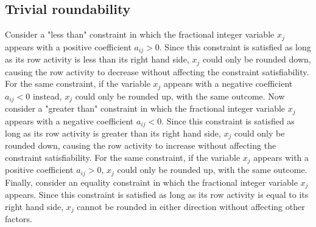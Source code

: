 \documentclass[a4paper,12pt]{book}
\begin{document}
\subsection{Trivial roundability}
Consider a "less than" constraint in which the fractional integer variable $x_j$ appears with a positive coefficient $a_{ij} > 0$. Since this constraint is satisfied as long as its row activity is less than its right hand side, $x_j$ could only be rounded down, causing the row activity to decrease without affecting the constraint satisfiability. For the same constraint, if the variable $x_j$ appears with a negative coefficient $a_{ij} < 0$ instead, $x_j$ could only be rounded up, with the same outcome.
Now consider a "greater than" constraint in which the fractional integer variable $x_j$ appears with a negative coefficient $a_{ij} < 0$. Since this constraint is satisfied as long as its row activity is greater than its right hand side, $x_j$ could only be rounded down, causing the row activity to increase without affecting the constraint satisfiability. For the same constraint, if the variable $x_j$ appears with a positive coefficient $a_{ij} > 0$, $x_j$ could only be rounded up, with the same outcome.
Finally, consider an equality constraint in which the fractional integer variable $x_j$ appears. Since this constraint is satisfied as long as its row activity is equal to its right hand side, $x_j$ cannot be rounded in either direction without affecting other factors. \par
\end{document}
